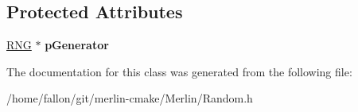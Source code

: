 \subsection*{Protected Attributes}
\begin{DoxyCompactItemize}
\item 
\mbox{\label{classRandom_ad96c1352a1eb2da25687af75af8be3f0}} 
\hyperlink{classRNG}{R\+NG} $\ast$ {\bfseries p\+Generator}
\end{DoxyCompactItemize}


The documentation for this class was generated from the following file\+:\begin{DoxyCompactItemize}
\item 
/home/fallon/git/merlin-\/cmake/\+Merlin/Random.\+h\end{DoxyCompactItemize}
